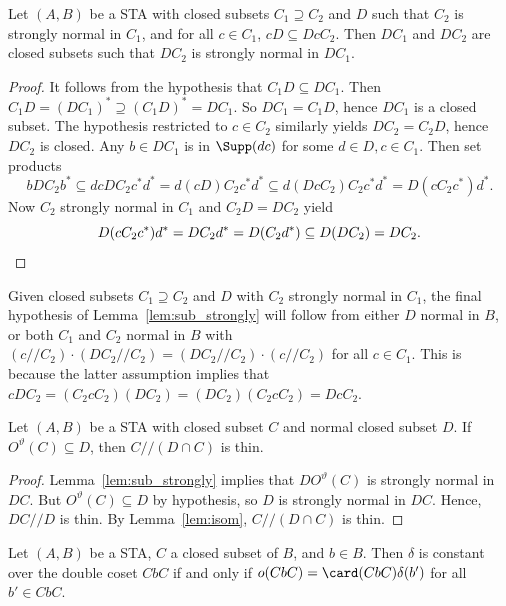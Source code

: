 \begin{lemm}
\label{lem:sub_strongly}
Let $(A, B)$ be a STA with closed subsets $C_1 \supseteq C_2$ and $D$
such that 
$C_2$ is strongly normal in $C_1$, and for all $c \in C_1$, $cD
\subseteq DcC_2$. 
 Then $DC_1$ and
$DC_2$ are closed subsets such that $DC_2$ is
strongly normal in $DC_1$.
\end{lemm} 

\begin{proof} 
It follows from the hypothesis that $C_1D \subseteq DC_1$. Then $C_1D =
(DC_1)^* \supseteq (C_1D)^* = DC_1$. So $DC_1 = C_1D$, hence $DC_1$ is
a closed subset. 
The hypothesis restricted to $c \in C_2$ similarly yields $DC_2 = C_2D$,
hence $DC_2$ is closed. 
Any $b \in DC_1$ is in $\Supp(dc)$ for some $d \in D, c \in C_1$. Then
set products 
\[
bDC_2b^* \subseteq dcDC_2c^*d^* = d(cD)C_2c^*d^* \subseteq
d(DcC_2)C_2c^*d^* = D(cC_2c^*)d^*.
\] 
Now $C_2$ strongly normal in $C_1$ and $C_2D = DC_2$ yield
\[
D(cC_2c^*)d^* = DC_2d^* = D(C_2d^*) \subseteq D(DC_2) = DC_2.\qedhere
\]
\end{proof}

\begin{rema}
\label{rem:hypoth}
Given closed subsets $C_1 \supseteq C_2$ and $D$ with $C_2$ strongly
normal in $C_1$, the final hypothesis of Lemma~\ref{lem:sub_strongly}
will follow from either $D$ normal in $B$, or both $C_1$ and $C_2$
normal in $B$ with $(c//C_2)\cdot(DC_2//C_2) =
(DC_2//C_2)\cdot(c//C_2)$ for all $c \in C_1$. This is because the latter assumption
implies that $cDC_2 = (C_2cC_2)(DC_2) = (DC_2)(C_2cC_2) = DcC_2$.
\end{rema}
 
\begin{lemm}
\label{lem:intersect}
Let $(A, B)$ be a STA with closed subset $C$ and normal closed subset
$D$. If $O^{\vartheta}(C) \subseteq D$, then $C//(D\cap C)$ is thin.
\end{lemm}

\begin{proof}
Lemma~\ref{lem:sub_strongly} implies that $DO^{\vartheta}(C)$ is
strongly normal in $DC$. But $O^{\vartheta}(C) \subseteq D$ by
hypothesis, so $D$ is strongly normal in $DC$. Hence, $DC//D$ is thin.
By Lemma~\ref{lem:isom}, $C//(D\cap C)$ is thin.
\end{proof}

\begin{lemm}
\label{lem:constant}
Let $(A, B)$ be a STA, $C$ a closed subset of $B$, and $b \in B$. Then
$\delta$ is constant over the double coset $CbC$ if and only if $o(CbC)
= \card(CbC)\delta(b')$ for all $b' \in CbC$.
\end{lemm}

